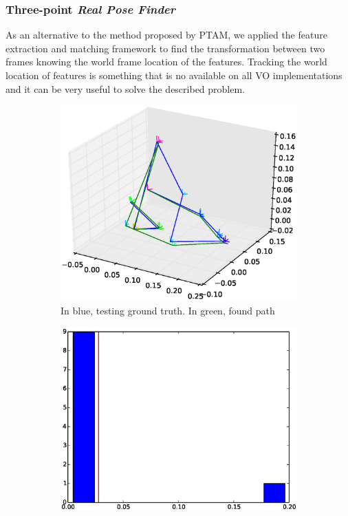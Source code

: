 \subsubsection{Three-point \textit{Real Pose Finder}}
\label{ssub:three_point_real_pose_finder}

As an alternative to the method proposed by PTAM, we applied the feature extraction and matching framework to find the transformation between two frames knowing the world frame location of the features. Tracking the world location of features is something that is no available on all VO implementations and it can be very useful to solve the described problem.\\

\begin{figure}[htpb]
  \begin{subfigure}[b]{6cm}
          \includegraphics[width=\linewidth]{img/desktop_2_naive_3pt_path_1.eps}
          \caption{In blue, testing ground truth. In green, found path}                
          \label{fig:desktop_2_naive_3pt_path_1}
  \end{subfigure}   
  \qquad
  \begin{subfigure}[b]{6cm}
          \includegraphics[width=\linewidth]{img/desktop_2_naive_3pt_dist_1.eps}

\end{subfigure}
\end{figure}
